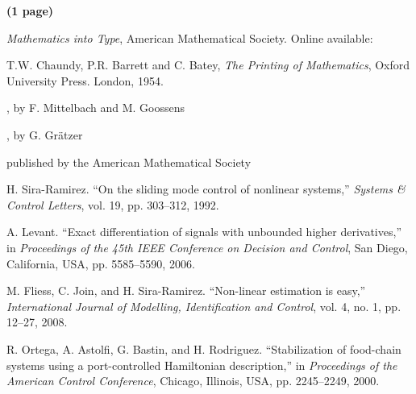 \documentclass[lettersize,journal]{IEEEtran}
\begin{document}
\textbf{(1 page)}


\begin{thebibliography}{1}

{\it{Mathematics into Type}}, American Mathematical Society. Online available: 

T.W. Chaundy, P.R. Barrett and C. Batey, {\it{The Printing of Mathematics}}, Oxford University Press. London, 1954.

, by F. Mittelbach and M. Goossens

, by G. Gr\"atzer

 published by the American Mathematical Society

H. Sira-Ramirez. ``On the sliding mode control of nonlinear systems,'' \textit{Systems \& Control Letters}, vol. 19, pp. 303--312, 1992.

A. Levant. ``Exact differentiation of signals with unbounded higher derivatives,''  in \textit{Proceedings of the 45th IEEE Conference on Decision and Control}, San Diego, California, USA, pp. 5585--5590, 2006.

M. Fliess, C. Join, and H. Sira-Ramirez. ``Non-linear estimation is easy,'' \textit{International Journal of Modelling, Identification and Control}, vol. 4, no. 1, pp. 12--27, 2008.

R. Ortega, A. Astolfi, G. Bastin, and H. Rodriguez. ``Stabilization of food-chain systems using a port-controlled Hamiltonian description,'' in \textit{Proceedings of the American Control Conference}, Chicago, Illinois, USA, pp. 2245--2249, 2000.

\end{thebibliography}



\end{document}
